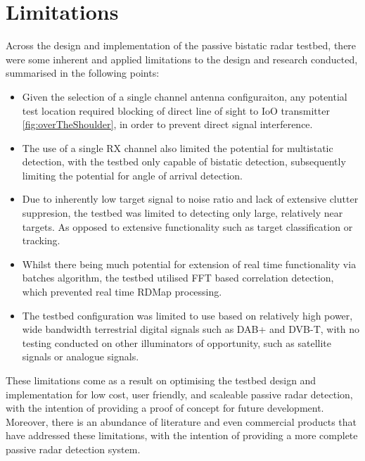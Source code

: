 \section{Limitations \label{sec: limitations}}
Across the design and implementation of the passive bistatic radar testbed, there were some inherent and applied limitations to the design and research conducted, summarised in the following points:
\begin{itemize}
    \item Given the selection of a single channel antenna configuraiton, any potential test location required blocking of direct line of sight to IoO transmitter \ref{fig:overTheShoulder}, in order to prevent direct signal interference.
    \item The use of a single RX channel also limited the potential for multistatic detection, with the testbed only capable of bistatic detection, subsequently limiting the potential for angle of arrival detection. 
    \item Due to inherently low target signal to noise ratio and lack of extensive clutter suppresion, the testbed was limited to detecting only large, relatively near targets. As opposed to extensive functionality such as target classification or tracking.
    \item Whilst there being much potential for extension of real time functionality via batches algorithm, the testbed utilised FFT based correlation detection, which prevented real time RDMap processing. 
    \item The testbed configuration was limited to use based on relatively high power, wide bandwidth terrestrial digital signals such as DAB+ and DVB-T, with no testing conducted on other illuminators of opportunity, such as satellite signals or analogue signals.
\end{itemize}

These limitations come as a result on optimising the testbed design and implementation for low cost, user friendly, and scaleable passive radar detection, with the intention of providing a proof of concept for future development. Moreover, there is an abundance of literature and even commercial products that have addressed these limitations, with the intention of providing a more complete passive radar detection system.


